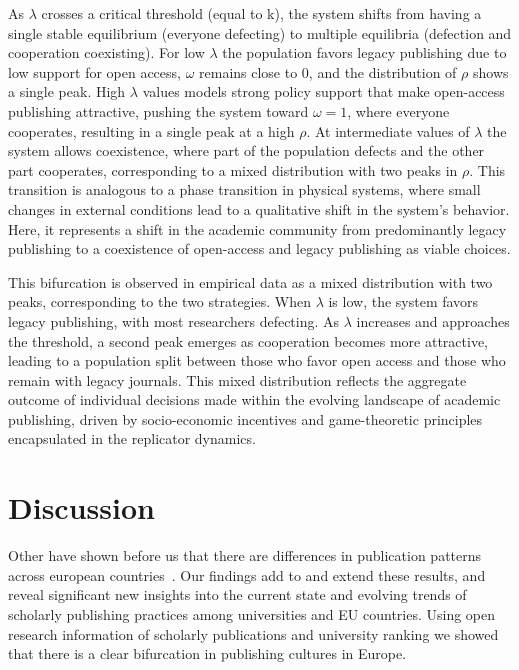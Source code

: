 \documentclass[amsfonts, amssymb, prl, superscriptaddress, notitlepage, twocolumn, nofootinbib]{revtex4-2}
\begin{document}
As $\lambda$ crosses a critical threshold (equal to k), the system shifts from having a single stable equilibrium (everyone defecting) to multiple equilibria (defection and cooperation coexisting). For low $\lambda$ the population favors legacy publishing due to low support for open access, $\omega$ remains close to 0, and the distribution of $\rho$ shows a single peak. High $\lambda$ values models strong policy support that make open-access publishing attractive, pushing the system toward $\omega = 1$, where everyone cooperates, resulting in a single peak at a high $\rho$. At intermediate values of $\lambda$ the system allows coexistence, where part of the population defects and the other part cooperates, corresponding to a mixed distribution with two peaks in $\rho$. This transition is analogous to a phase transition in physical systems, where small changes in external conditions lead to a qualitative shift in the system's behavior. Here, it represents a shift in the academic community from predominantly legacy publishing to a coexistence of open-access and legacy publishing as viable choices.

This bifurcation is observed in empirical data as a mixed distribution with two peaks, corresponding to the two strategies. When $\lambda$ is low, the system favors legacy publishing, with most researchers defecting. As $\lambda$ increases and approaches the threshold, a second peak emerges as cooperation becomes more attractive, leading to a population split between those who favor open access and those who remain with legacy journals. This mixed distribution reflects the aggregate outcome of individual decisions made within the evolving landscape of academic publishing, driven by socio-economic incentives and game-theoretic principles encapsulated in the replicator dynamics.


\section{Discussion}
Other have shown before us that there are differences in publication patterns across european countries~\cite{kulczycki_publication_2018,sasvari2023current,csomos_understanding_2023}. 
Our findings add to and extend these results, and reveal significant new insights into the current state and evolving trends of scholarly publishing practices among universities and EU countries. Using open research information of scholarly publications and university ranking we showed that there is a clear bifurcation in publishing cultures in Europe. 
\end{document}
